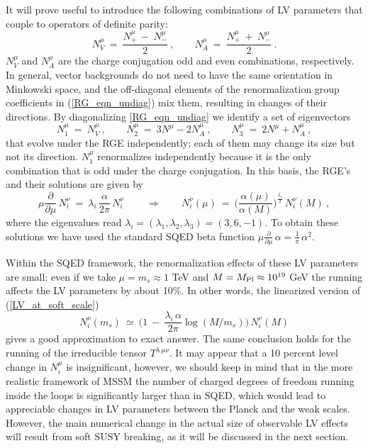 \documentclass[12pt]{revtex4}
\begin{document}
It will prove useful to introduce the following combinations of 
LV parameters that couple to operators of definite parity:
\begin{equation}
\label{def_Nmu}
      N^\mu_V ~=~  \frac{ N_+^\mu ~-~ N_-^\mu }{2}~,   
\qquad 
      N^\mu_A ~=~  \frac{ N_+^\mu ~+~ N_-^\mu }{2}~.
\end{equation}
%
$N^\mu_V$ and $N^\mu_A$ are the charge conjugation odd and even
combinations, respectively. In general, vector backgrounds do not need
to have  the same orientation in Minkowski space, and the off-diagonal
elements of the renormalization group coefficients  in
(\ref{RG_eqn_undiag}) mix them, resulting in changes of their
directions.  By diagonalizing \eqref{RG_eqn_undiag} we identify a 
set of eigenvectors  
%
\begin{equation}
N_1^\mu ~=~ N^\mu_V~, 
\qquad 
N_2^\mu ~=~ 3 N^\mu - 2 N^\mu_A~,
\qquad 
N_3^\mu ~=~ 2 N^\mu + N^\mu_A~,
\end{equation} 
%
that evolve under the RGE independently; each of them may change its
size but not its direction. $N_1^\mu$ renormalizes independently
because it is the only combination that is odd under the charge
conjugation. 
In this basis, the RGE's and their solutions are given by 
\begin{equation} 
\mu \frac{\partial}{\partial\mu} \, N_i^\nu 
~=~ \lambda_i\, \frac { \alpha}{2 \pi} \, N_i^\nu~ 
\qquad \Rightarrow \qquad 
N_i^\nu(\mu) ~=~ 
\Big(  \frac {\alpha(\mu)}{\alpha(M)} \Big)^{\frac {\lambda_i}2} \, 
N_i^\nu(M)~, 
\label{LV_at_soft_scale}
\end{equation} 
where the eigenvalues read 
$\lambda_i = (\lambda_1, \lambda_2, \lambda_3) = (3, 6, -1)$. 
To obtain these solutions we have used the standard SQED beta function
\( 
\mu \frac{\partial}{\partial\mu} \, \alpha = \frac 1{\pi} \,
\alpha^2.  
\) 


Within the SQED framework, the renormalization effects of these LV
parameters are small: even if we take $\mu = m_{s} \approx 1$ TeV and
$M = M_{\rm Pl} \approx 10^{19}$ GeV the running affects the LV
parameters by about 10\%. In other words, the linearized version of
(\ref{LV_at_soft_scale})  
%
\begin{equation}
N_i^\nu(m_s) ~\simeq~ 
\Big(1~-~ \frac{\lambda_i\, \alpha}{2\pi}\log (M/m_s)
\Big)\, N_i^\nu(M)
\label{simplified}
\end{equation}
%
gives a good approximation to exact answer. 
The same conclusion holds for the running of the
irreducible tensor $T^{\lambda\, \mu\nu}$. 
It may appear that a 10 percent level change in $N_i^\mu$ is
insignificant, however, we should keep in mind that in the more
realistic framework of MSSM the number of charged degrees of 
freedom running inside the loops is significantly larger than in SQED, 
which would lead to appreciable changes in LV parameters 
between the Planck and the weak scales. However, the main numerical
change in the actual size of observable LV effects will result from
soft SUSY breaking, as it will be discussed in the next section. 
\end{document}

